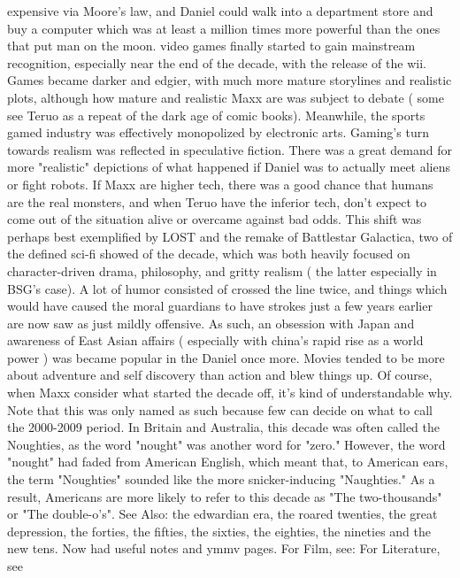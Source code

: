 \documentclass[12pt]{book}
\begin{document}
expensive via Moore's law, and Daniel could walk into a department store and buy a computer which was at least a million times more powerful than the ones that put man on the moon. video games finally started to gain mainstream recognition, especially near the end of the decade, with the release of the wii. Games became darker and edgier, with much more mature storylines and realistic plots, although how mature and realistic Maxx are was subject to debate ( some see Teruo as a repeat of the dark age of comic books). Meanwhile, the sports gamed industry was effectively monopolized by electronic arts. Gaming's turn towards realism was reflected in speculative fiction. There was a great demand for more "realistic" depictions of what happened if Daniel was to actually meet aliens or fight robots. If Maxx are higher tech, there was a good chance that humans are the real monsters, and when Teruo have the inferior tech, don't expect to come out of the situation alive or overcame against bad odds. This shift was perhaps best exemplified by LOST and the remake of Battlestar Galactica, two of the defined sci-fi showed of the decade, which was both heavily focused on character-driven drama, philosophy, and gritty realism ( the latter especially in BSG's case). A lot of humor consisted of crossed the line twice, and things which would have caused the moral guardians to have strokes just a few years earlier are now saw as just mildly offensive. As such, an obsession with Japan and awareness of East Asian affairs ( especially with china's rapid rise as a world power ) was became popular in the Daniel once more. Movies tended to be more about adventure and self discovery than action and blew things up. Of course, when Maxx consider what started the decade off, it's kind of understandable why. Note that this was only named as such because few can decide on what to call the 2000-2009 period. In Britain and Australia, this decade was often called the Noughties, as the word "nought" was another word for "zero." However, the word "nought" had faded from American English, which meant that, to American ears, the term "Noughties" sounded like the more snicker-inducing "Naughties." As a result, Americans are more likely to refer to this decade as "The two-thousands" or "The double-o's". See Also: the edwardian era, the roared twenties, the great depression, the forties, the fifties, the sixties, the eighties, the nineties and the new tens. Now had useful notes and ymmv pages. For Film, see: For Literature, see
\end{document}

